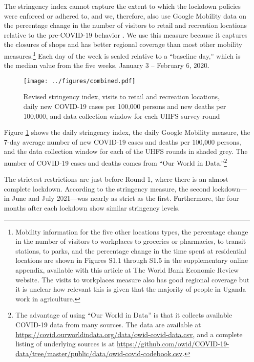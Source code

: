 \documentclass{wber}
\begin{document}
The stringency index cannot capture the extent to which the lockdown
policies were enforced or adhered to, and we, therefore, also use Google
Mobility data on the percentage change in the number of visitors to
retail and recreation locations relative to the pre-COVID-19 behavior
\citep{Google2022}. We use this measure because it captures the closures
of shops and has better regional coverage than most other mobility
measures.\footnote{Mobility information for the five other locations
  types, the percentage change in the number of visitors to workplaces
  to groceries or pharmacies, to transit stations, to parks, and the
  percentage change in the time spent at residential locations are shown
  in Figures S1.1 through S1.5  in the supplementary online appendix, available 
  with this article at The World Bank Economic Review website.
  The visits to workplaces measure also has good regional coverage but it is unclear
  how relevant this is given that the majority of people in Uganda work
  in agriculture.} Each day of the week is scaled relative to a
``baseline day,'' which is the median value from the five weeks, January
3 -- February 6, 2020.

\begin{figure}
\centering
\texttt{[image: ../figures/combined.pdf]}
\caption{Revised stringency index, visits to retail and recreation
locations, daily new COVID-19 cases per 100,000 persons and new deaths
per 100,000, and data collection window for each UHFS survey
round}\label{fig:combined}
\end{figure}

Figure \ref{fig:combined} shows the daily stringency index, the daily
Google Mobility measure, the 7-day average number of new COVID-19 cases
and deaths per 100,000 persons, and the data collection window for each
of the UHFS rounds in shaded grey. The number of COVID-19 cases and
deaths comes from ``Our World in Data.''\footnote{The advantage of using
  ``Our World in Data'' is that it collects available COVID-19 data from
  many sources. The data are available
  at \url{https://covid.ourworldindata.org/data/owid-covid-data.csv},
  and a complete listing of underlying sources is
  at \url{https://github.com/owid/COVID-19-data/tree/master/public/data/owid-covid-codebook.csv}.}

The strictest restrictions are just before Round 1, where there is an
almost complete lockdown. According to the stringency measure, the
second lockdown---in June and July 2021---was nearly as strict as the
first. Furthermore, the four months after each lockdown show similar
stringency levels.
\end{document}
